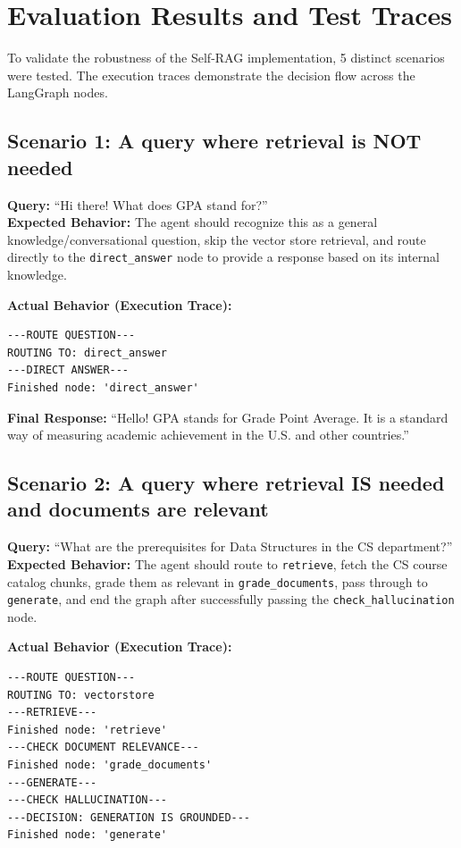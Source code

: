 \documentclass[12pt,a4paper]{article}
\begin{document}
\section{Evaluation Results and Test Traces}
To validate the robustness of the Self-RAG implementation, 5 distinct scenarios were tested. The execution traces demonstrate the decision flow across the LangGraph nodes.

\subsection{Scenario 1: A query where retrieval is NOT needed}
\textbf{Query:} ``Hi there! What does GPA stand for?''\\
\textbf{Expected Behavior:} The agent should recognize this as a general knowledge/conversational question, skip the vector store retrieval, and route directly to the \texttt{direct\_answer} node to provide a response based on its internal knowledge.

\textbf{Actual Behavior (Execution Trace):}
\begin{lstlisting}
---ROUTE QUESTION---
ROUTING TO: direct_answer
---DIRECT ANSWER---
Finished node: 'direct_answer'
\end{lstlisting}

\textbf{Final Response:}
``Hello! GPA stands for Grade Point Average. It is a standard way of measuring academic achievement in the U.S. and other countries.''

\subsection{Scenario 2: A query where retrieval IS needed and documents are relevant}
\textbf{Query:} ``What are the prerequisites for Data Structures in the CS department?''\\
\textbf{Expected Behavior:} The agent should route to \texttt{retrieve}, fetch the CS course catalog chunks, grade them as relevant in \texttt{grade\_documents}, pass through to \texttt{generate}, and end the graph after successfully passing the \texttt{check\_hallucination} node.

\textbf{Actual Behavior (Execution Trace):}
\begin{lstlisting}
---ROUTE QUESTION---
ROUTING TO: vectorstore
---RETRIEVE---
Finished node: 'retrieve'
---CHECK DOCUMENT RELEVANCE---
Finished node: 'grade_documents'
---GENERATE---
---CHECK HALLUCINATION---
---DECISION: GENERATION IS GROUNDED---
Finished node: 'generate'
\end{lstlisting}
\end{document}
